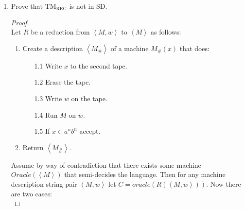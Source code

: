 \documentclass[10pt]{article}
\newcommand{\brackets}[1]{\left< #1 \right>}
\begin{document}
\begin{enumerate}[1)]
\begin{enumerate}[a)]
\begin{proof}[Proof]
\begin{enumerate}[1.]
\begin{enumerate}
\item[1.4]
Accept.
\end{enumerate}
\item
Return $\brackets{M_1, M_2}$
\end{enumerate}

Assume by way of contradiction that there exists some machine $Oracle(\brackets{M})$ that semi-decides the language.  Then for any machine description string pair $\brackets{M, w}$ let $C = oracle(R(\brackets{M, w}))$. Now there are two cases:\\

If $\brackets{M, w} \in \lnot$ H: $M_1$ accepts nothing and $L(M_1) - L(M_2) = \emptyset$.  Oracle accepts.\\
If $\brackets{M, w} \not \in \lnot$ H: $M_2$ accepts everything and $L(M_1) - L(M_2) = \Sigma ^*$.  Oracle rejects.\\

So $C$ decides $\lnot$ H.  Therefore $Oracle$ does not exist.
\end{proof}
\end{enumerate}


\pagebreak

\item
Prove that $\mathrm{TM_{REG}}$ is not in SD.
\begin{proof}[Proof]$ $\\
Let $R$ be a reduction from $\brackets{M, w}$ to $\brackets{M}$ as follows:
\begin{enumerate}[1.]
\item
Create a description $\brackets{M_\#}$ of a machine $M_\#(x)$ that does:
\begin{enumerate}
\item[1.1]
Write $x$ to the second tape.

\item[1.2]
Erase the tape.

\item[1.3]
Write $w$ on the tape.

\item[1.4]
Run $M$ on $w$.

\item[1.5]
If $x \in a^nb^n$ accept.
\end{enumerate}
\item
Return $\brackets{M_\#}$.
\end{enumerate}

Assume by way of contradiction that there exists some machine $Oracle(\brackets{M})$ that semi-decides the language.  Then for any machine description string pair $\brackets{M, w}$ let $C = oracle(R(\brackets{M, w}))$. Now there are two cases:\\


\end{proof}
\end{enumerate}
\end{document}
